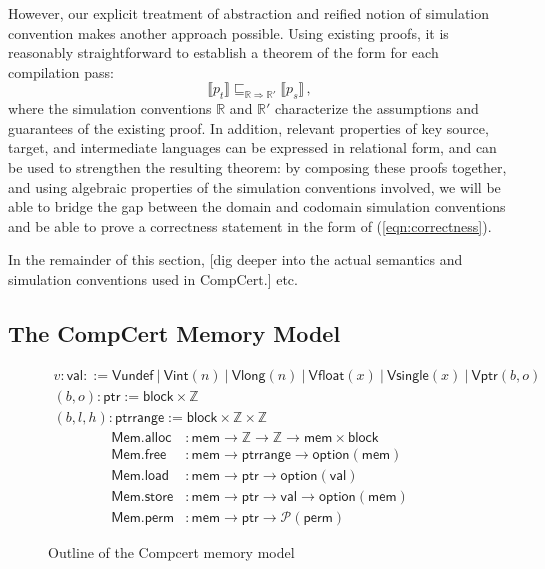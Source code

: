 \documentclass[acmsmall,timestamp,review]{acmart}
\newcommand{\kw}[1]{\ensuremath{ \mathsf{#1} }}
\newcommand{\alt}{\ |\ } %
\begin{document}
However,
our explicit treatment of abstraction
and reified notion of simulation convention
makes another approach possible.
Using existing proofs, it is reasonably straightforward
to establish a theorem of the form
for each compilation pass:
\begin{equation}
    \label{correctness-alt}
    \llbracket p_t \rrbracket
    \sqsubseteq_{\mathbb{R} \Rightarrow \mathbb{R}'}
    \llbracket p_s \rrbracket \,,
\end{equation}
where the simulation conventions $\mathbb{R}$ and $\mathbb{R}'$
characterize the assumptions and guarantees
of the existing proof.
In addition,
relevant properties of key source, target, and intermediate languages
can be expressed in relational form,
and can be used to strengthen the resulting theorem:
by composing these proofs together,
and using algebraic properties of
the simulation conventions involved,
we will be able to bridge the gap
between the domain and codomain simulation conventions
and be able to prove a correctness statement
in the form of (\ref{eqn:correctness}).

In the remainder of this section,
[dig deeper into the actual semantics and
simulation conventions used in CompCert.]
etc.


\subsection{The CompCert Memory Model} %

\begin{figure} %
  \begin{gather*}
    v : \kw{val} ::=
      \kw{Vundef} \alt
      \kw{Vint}(n) \alt
      \kw{Vlong}(n) \alt
      \kw{Vfloat}(x) \alt
      \kw{Vsingle}(x) \alt
      \kw{Vptr}(b, o)
    \\
    (b, o) : \kw{ptr} :=
      \kw{block} \times \mathbb{Z}
    \\
    (b, l, h) : \kw{ptrrange} :=
      \kw{block} \times \mathbb{Z} \times \mathbb{Z}
  \end{gather*}
  \begin{align*}
    \kw{Mem.alloc} &:
      \kw{mem} \rightarrow \mathbb{Z} \rightarrow \mathbb{Z} \rightarrow
      \kw{mem} \times \kw{block}
    \\
    \kw{Mem.free} &:
      \kw{mem} \rightarrow
      \kw{ptrrange} \rightarrow
      \kw{option}(\kw{mem})
    \\
    \kw{Mem.load} &:
      \kw{mem} \rightarrow \kw{ptr} \rightarrow \kw{option}(\kw{val})
    \\
    \kw{Mem.store} &:
      \kw{mem} \rightarrow \kw{ptr} \rightarrow \kw{val} \rightarrow \kw{option}(\kw{mem})
    \\
    \kw{Mem.perm} &:
      \kw{mem} \rightarrow \kw{ptr} \rightarrow \mathcal{P}(\kw{perm})
  \end{align*}
  \caption{Outline of the Compcert memory model}
  \label{fig:mm}
\end{figure}
\end{document}
